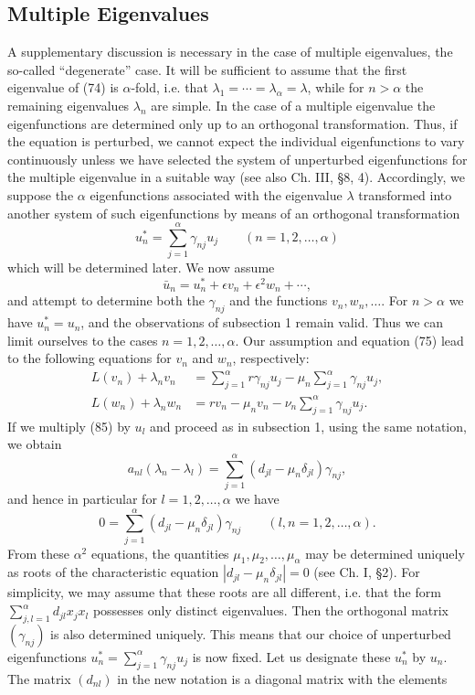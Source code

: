 \subsection{Multiple Eigenvalues}
A supplementary discussion is necessary in the case of multiple eigenvalues, the so-called ``degenerate'' case. It will be sufficient to assume that the first eigenvalue of (74) is $\alpha$-fold, i.e. that $\lambda_1=\cdots=\lambda_\alpha=\lambda$, while for $n>\alpha$ the remaining eigenvalues $\lambda_n$ are simple. In the case of a multiple eigenvalue the eigenfunctions are determined only up to an orthogonal transformation. Thus, if the equation is perturbed, we cannot expect the individual eigenfunctions to vary continuously unless we have selected the system of unperturbed eigenfunctions for the multiple eigenvalue in a suitable way (see also Ch. III, \S8, 4). Accordingly, we suppose the $\alpha$ eigenfunctions associated with the eigenvalue $\lambda$ transformed into another system of such eigenfunctions by means of an orthogonal transformation
\[
u_n^*=\sum_{j=1}^{\alpha}\gamma_{nj}u_j\qquad(n=1,2,\ldots,\alpha)
\]
which will be determined later. We now assume
\[
\bar u_n=u_n^*+\epsilon v_n+\epsilon^2w_n+\cdots,
\]
and attempt to determine both the $\gamma_{nj}$ and the functions $v_n,w_n,\ldots$. For $n>\alpha$ we have $u_n^*=u_n$, and the observations of subsection 1 remain valid. Thus we can limit ourselves to the cases $n=1,2,\ldots,\alpha$. Our assumption and equation (75) lead to the following equations for $v_n$ and $w_n$, respectively:
\begin{align}
L(v_n)+\lambda_nv_n&=\sum_{j=1}^{\alpha}r\gamma_{nj}u_j-\mu_n\sum_{j=1}^{\alpha}\gamma_{nj}u_j, \tag{85}\\
L(w_n)+\lambda_nw_n&=rv_n-\mu_nv_n-\nu_n\sum_{j=1}^{\alpha}\gamma_{nj}u_j. \tag{86}
\end{align}
If we multiply (85) by $u_l$ and proceed as in subsection 1, using the same notation, we obtain
\begin{equation}
a_{nl}(\lambda_n-\lambda_l)=\sum_{j=1}^{\alpha}(d_{jl}-\mu_n\delta_{jl})\gamma_{nj},
\tag{87}
\end{equation}
and hence in particular for $l=1,2,\ldots,\alpha$ we have
\[
0=\sum_{j=1}^{\alpha}(d_{jl}-\mu_n\delta_{jl})\gamma_{nj}
\qquad(l,n=1,2,\ldots,\alpha).
\]
From these $\alpha^2$ equations, the quantities $\mu_1,\mu_2,\ldots,\mu_\alpha$ may be determined uniquely as roots of the characteristic equation $|d_{jl}-\mu_n\delta_{jl}|=0$ (see Ch. I, \S2). For simplicity, we may assume that these roots are all different, i.e. that the form $\sum_{j,l=1}^{\alpha}d_{jl}x_jx_l$ possesses only distinct eigenvalues. Then the orthogonal matrix $(\gamma_{nj})$ is also determined uniquely. This means that our choice of unperturbed eigenfunctions $u_n^*=\sum_{j=1}^{\alpha}\gamma_{nj}u_j$ is now fixed. Let us designate these $u_n^*$ by $u_n$. The matrix $(d_{nl})$ in the new notation is a diagonal matrix with the elements
